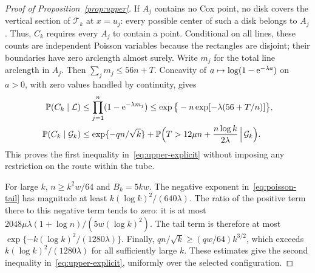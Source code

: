 \documentclass[11pt,letterpaper]{article}
\begin{document}
\begin{proof}[Proof of Proposition~\ref{prop:upper}]
If $A_j$ contains no Cox point, no disk covers the vertical section of $\mathcal T_k$ at $x=u_j$: every possible center of such a disk belongs to $A_j$. Thus, $C_k$ requires every $A_j$ to contain a point. Conditional on all lines, these counts are independent Poisson variables because the rectangles are disjoint; their boundaries have zero arclength almost surely. Write $m_j$ for the total line arclength in $A_j$. Then $\sum_jm_j\le56n+T$. Concavity of $a\mapsto\log(1-\mathrm{e}^{-\lambda a})$ on $a>0$, with zero values handled by continuity, gives
\begin{equation}\label{eq:point-cost}
\begin{aligned}
 \mathbb P(C_k\mid\mathcal L)
 &\le\prod_{j=1}^n(1-\mathrm{e}^{-\lambda m_j})
 \le\exp\big\{-n\exp[-\lambda(56+T/n)]\big\},\\
 \mathbb P(C_k\mid\mathcal G_k)
 &\le\exp\{-qn/\sqrt k\}
   +\mathbb P\Big(T>12\mu n+\frac{n\log k}{2\lambda}\,\Big|\,\mathcal G_k\Big).
\end{aligned}
\end{equation}
This proves the first inequality in~\eqref{eq:upper-explicit} without imposing any restriction on the route within the tube.

For large $k$, $n\ge k^2w/64$ and $B_k=5kw$. The negative exponent in~\eqref{eq:poisson-tail} has magnitude at least $k(\log k)^2/(640\lambda)$. The ratio of the positive term there to this negative term tends to zero: it is at most $2048\mu\lambda(1+\log n)/(5w(\log k)^2)$. The tail term is therefore at most $\exp\{-k(\log k)^2/(1280\lambda)\}$. Finally, $qn/\sqrt k\ge(qw/64)k^{3/2}$, which exceeds $k(\log k)^2/(1280\lambda)$ for all sufficiently large $k$. These estimates give the second inequality in~\eqref{eq:upper-explicit}, uniformly over the selected configuration.
\end{proof}
\end{document}
